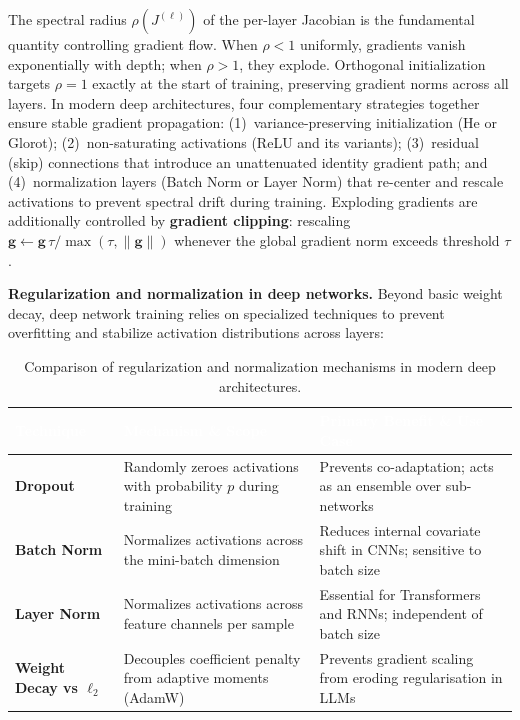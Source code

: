 \documentclass[11pt,a4paper]{article}
\begin{document}
	\begin{keyconcept}
		The spectral radius $\rho(J^{(\ell)})$ of the per-layer Jacobian is the fundamental quantity controlling gradient flow. When $\rho < 1$ uniformly, gradients vanish exponentially with depth; when $\rho > 1$, they explode. Orthogonal initialization targets $\rho = 1$ exactly at the start of training, preserving gradient norms across all layers. In modern deep architectures, four complementary strategies together ensure stable gradient propagation: (1)~variance-preserving initialization (He or Glorot); (2)~non-saturating activations (ReLU and its variants); (3)~residual (skip) connections that introduce an unattenuated identity gradient path; and (4)~normalization layers (Batch Norm or Layer Norm) that re-center and rescale activations to prevent spectral drift during training. Exploding gradients are additionally controlled by \textbf{gradient clipping}: rescaling $\boldsymbol{g} \leftarrow \boldsymbol{g}\,\tau/\max(\tau, \|\boldsymbol{g}\|)$ whenever the global gradient norm exceeds threshold $\tau$.
	\end{keyconcept}

	\textbf{Regularization and normalization in deep networks.} Beyond basic weight decay, deep network training relies on specialized techniques to prevent overfitting and stabilize activation distributions across layers:
	
	\begin{table}[ht]
		\centering
		\small\sffamily
		\renewcommand{\arraystretch}{1.3}
		\begin{tabular}{@{}L{3.2cm} L{4.5cm} L{6.8cm}@{}}
			\toprule
			\textcolor{white}{\textbf{Technique}} & \textcolor{white}{\textbf{Mechanism \& Scope}} & \textcolor{white}{\textbf{Primary Benefit \& Use Case}} \\
			\midrule
			\textbf{Dropout} & Randomly zeroes activations with probability $p$ during training & Prevents co-adaptation; acts as an ensemble over sub-networks \\
			\textbf{Batch Norm} & Normalizes activations across the mini-batch dimension & Reduces internal covariate shift in CNNs; sensitive to batch size \\
			\textbf{Layer Norm} & Normalizes activations across feature channels per sample & Essential for Transformers and RNNs; independent of batch size \\
			\textbf{Weight Decay vs $\ell_2$} & Decouples coefficient penalty from adaptive moments (AdamW) & Prevents gradient scaling from eroding regularisation in LLMs \\
			\bottomrule
		\end{tabular}
		\caption{Comparison of regularization and normalization mechanisms in modern deep architectures.}
		\label{tab:reg_norm}
	\end{table}
\end{document}
